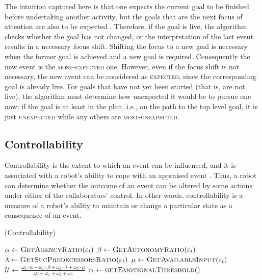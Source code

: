 \documentclass{article}
\begin{document}
The intuition captured here is that one expects the current goal to be finished
before undertaking another activity, but the goals that are the next focus of
attention are also to be expected \cite{rich:focused-unfocused-users}.
Therefore, if the goal is live, the algorithm checks whether the goal has not
changed, or the interpretation of the last event results in a necessary focus
shift. Shifting the focus to a new goal is necessary when the former goal is
achieved and a new goal is required. Consequently the new event is the
\textsc{most-expected} one. However, even if the focus shift is not necessary,
the new event can be considered as \textsc{expected}, since the corresponding
goal is already live. For goals that have not yet been started (that is, are not
live), the algorithm must determine how unexpected it would be to pursue one
now; if the goal is at least in the plan, i.e., on the path to the top level
goal, it is just \textsc{unexpected} while any others are
\textsc{most-unexpected}.

\subsection{Controllability}
\label{sec:controllability}

Controllability is the extent to which an event can be influenced, and it is
associated with a robot's ability to cope with an appraised event
\cite{gratch:domain-independent}. Thus, a robot can determine whether the
outcome of an event can be altered by some actions under either of the
collaborators' control. In other words, controllability is a measure of a
robot's ability to maintain or change a particular state as a consequence of an
event.

\begin{algorithm}
	\caption{(Controllability)}
	\label{alg:controllability}
	\begin{algorithmic}[1]
			\Statex
			\State $\alpha \gets \Call{GetAgencyRatio}{\varepsilon_t}$ 
			\State $\beta \gets \Call{GetAutonomyRatio}{\varepsilon_t}$
			\Statex
			\State $\lambda \gets \Call{GetSucPredecessorsRatio}{\varepsilon_t}$
			\State $\mu \gets \Call{GetAvailableInput}{\varepsilon_t}$
			\Statex
			\State $\mathcal{U} \gets
			\frac{\omega_{0}\cdot \alpha + \omega_{1}\cdot \beta + \omega_{2}\cdot
			\lambda + \omega_{3}\cdot \mu}{\omega_{0} + \omega_{1} + \omega_{2} +
			\omega_{3}}$
			\Statex
			\State $\tau_{t} \gets \Call{getEmotionalThreshold}{ }$
			\Statex
				\State {}
			\Else
				\State {}
			\EndIf
		\EndFunction
	\end{algorithmic}
\end{algorithm}
\end{document}
